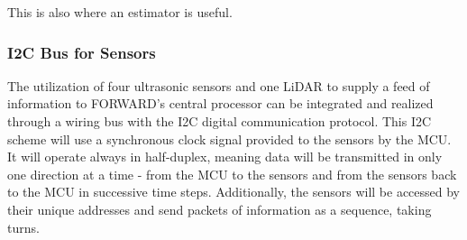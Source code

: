 \noindent This is also where an estimator is useful.\\

\subsubsection{I2C Bus for Sensors}
\noindent The utilization of four ultrasonic sensors and one LiDAR to supply a feed of information to FORWARD's central processor can be integrated and realized through a wiring bus with the I2C digital communication protocol. This I2C scheme will use a synchronous clock signal provided to the sensors by the MCU. It will operate always in half-duplex, meaning data will be transmitted in only one direction at a time - from the MCU to the sensors and from the sensors back to the MCU in successive time steps. Additionally, the sensors will be accessed by their unique addresses and send packets of information as a sequence, taking turns.\\